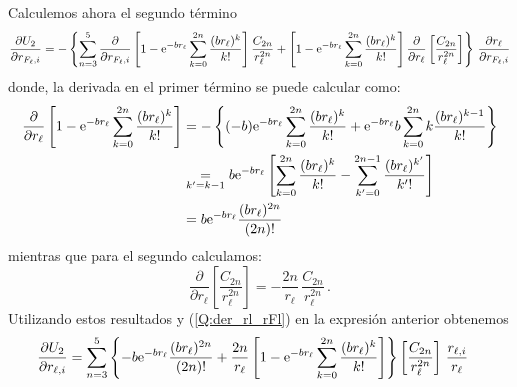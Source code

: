 \begin{subappendices}
Calculemos ahora el segundo t\'{e}rmino
\begin{equation*}
  \frac{\partial U_{2}}{\partial r_{F_{\ell},i}} = - \left\{\sum_{n=3}^{5} \frac{\partial}{\partial r_{F_{\ell},i}}\left[ 1 - \mathrm{e}^{-br_{\ell}} \sum_{k=0}^{2n}\frac{(br_{\ell})^{k}}{k!}\right] \frac{C_{2n}}{r_{\ell}^{2n}} + \left[ 1 - \mathrm{e}^{-br_{\ell}} \sum_{k=0}^{2n}\frac{(br_{\ell})^{k}}{k!}\right] \frac{\partial}{\partial r_{\ell}}\left[ \frac{C_{2n}}{r_{\ell}^{2n}}\right] \right\} \, \frac{\partial r_{\ell}}{\partial r_{F_{\ell},i}}
\end{equation*}
%
donde, la derivada en el primer t\'{e}rmino se puede calcular como:
\begin{align*}
 \frac{\partial}{\partial r_{\ell}}\left[ 1 - \mathrm{e}^{-br_{\ell}} \sum_{k=0}^{2n}\frac{(br_{\ell})^{k}}{k!}\right] &= - \left\{(-b) \mathrm{e}^{-br_{\ell}} \sum_{k=0}^{2n}\frac{(br_{\ell})^{k}}{k!} + \mathrm{e}^{-br_{\ell}} b \, { \sum_{k=0}^{2n}  k \frac{(br_{\ell})^{k-1}}{k!}} \right\} 
\\
&\mathrel{\mathop{\kern0pt=}\limits_{k'=k-1}}  b \mathrm{e}^{-br_{\ell}} \left[\sum_{k=0}^{2n}\frac{(br_{\ell})^{k}}{k!} - \sum_{k'=0}^{2n-1} \frac{(br_{\ell})^{k'}}{k'!}\right] 
\\
&=  b \mathrm{e}^{-br_{\ell}} \frac{(b r_{\ell})^{2n}}{(2n)!}
\end{align*}
%
mientras que para el segundo calculamos:
\begin{equation*}
 \frac{\partial}{\partial r_{\ell}}\left[ \frac{C_{2n}}{r_{\ell}^{2n}}\right] = -\frac{2n}{r_{\ell}}\, \frac{C_{2n}}{r_{\ell}^{2n}} \,.
\end{equation*}
%
Utilizando estos resultados y (\ref{Q:der_rl_rFl}) en la expresi\'{o}n anterior obtenemos
\begin{align}\label{Q:pot-inter-dU2}
  \frac{\partial U_{2}}{\partial r_{\ell,i}} &= \sum_{n=3}^{5} \left\{ -b \mathrm{e}^{-br_{\ell}} \frac{(b r_{\ell})^{2n}}{(2n)!} + \frac{2n}{r_{\ell}} \left[ 1 - \mathrm{e}^{-br_{\ell}} \sum_{k=0}^{2n}\frac{(br_{\ell})^{k}}{k!}\right] \right\}  \left[ \frac{C_{2n}}{r_{\ell}^{2n}}\right]\, \frac{r_{\ell,i}}{r_{\ell}} 
\end{align}
\medskip


\end{subappendices}
